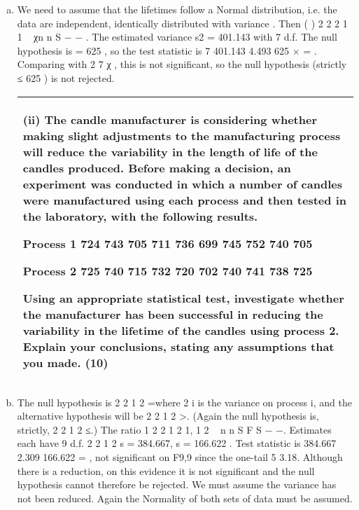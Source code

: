 \documentclass[a4paper,12pt]{article}
\begin{document}
 
\begin{enumerate}[(a)]
\item  We need to assume that the lifetimes follow a Normal distribution, i.e. the data
are independent, identically distributed with variance  .
Then ( ) 2
2
2 1
1
~ χn
n S
\sigma −
−
.
The estimated variance s2 = 401.143 with 7 d.f.
The null hypothesis is  = 625 , so the test statistic is 7 401.143 4.493
625
× = .
Comparing with 2
7 χ , this is not significant, so the null hypothesis (strictly  ≤ 625 )
is not rejected.



\newpage

\begin{table}[ht!]
 
\centering
 
\begin{tabular}{|p{15cm}|}
 
\hline  

(ii) The candle manufacturer is considering whether making slight adjustments to the manufacturing process will reduce the variability in the length of life of the candles produced.  Before making a decision, an experiment was conducted in which a number of candles were manufactured using each process and then tested in the laboratory, with the following results. 
 
   Process 1 724  743  705  711  736  699  745  752  740  705 
 
   Process 2 725  740  715  732  720  702  740  741  738  725 
 
Using an appropriate statistical test, investigate whether the manufacturer has been successful in reducing the variability in the lifetime of the candles using process 2.  Explain your conclusions, stating any assumptions that you made. (10)


\\ \hline
  
\end{tabular}

\end{table} 



\item The null hypothesis is 2 2
1 2 \sigma =\sigma where 2
i \sigma
is the variance on process i, and the
alternative hypothesis will be 2 2
1 2 \sigma >\sigma . (Again the null hypothesis is, strictly,
2 2
1 2 \sigma ≤\sigma .)
The ratio 1 2
2
1
2 1, 1
2
~ n n
S F
S − −. Estimates each have 9 d.f. 2 2
1 2 s = 384.667, s = 166.622 .
Test statistic is 384.667 2.309
166.622
= , not significant on F9,9 since the one-tail 5%
3.18.
Although there is a reduction, on this evidence it is not significant and the null
hypothesis cannot therefore be rejected. We must assume the variance has not been
reduced. Again the Normality of both sets of data must be assumed.

\end{enumerate}
\end{document}
